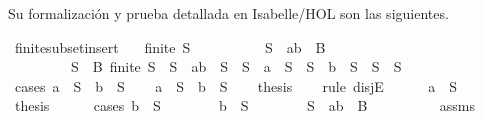 \begin{isabellebody}
\begin{isamarkuptext}
  Su formalización y prueba detallada en Isabelle/HOL son las siguientes.%
\end{isamarkuptext}\isamarkuptrue%
\isamarkupfalse%
\ finite{\isacharunderscore}subset{\isacharunderscore}insert{}{\isacharcolon}\isanewline
\ \ \ {\isachardoublequoteopen}finite\ S{\isachardoublequoteclose}\isanewline
\ \ \ \ \ \ \ \ \ \ {\isachardoublequoteopen}S\ {\isasymsubseteq}\ {\isacharbraceleft}a{\isacharcomma}b{\isacharbraceright}\ {\isasymunion}\ B{\isachardoublequoteclose}\isanewline
\ \ \ \ \ \ \ \ \ {\isachardoublequoteopen}{\isasymexists}S{\isacharprime}\ {\isasymsubseteq}\ B{\isachardot}\ finite\ S{\isacharprime}\ {\isasymand}\ {\isacharparenleft}S\ {\isacharequal}\ {\isacharbraceleft}a{\isacharcomma}b{\isacharbraceright}\ {\isasymunion}\ S{\isacharprime}\ {\isasymor}\ S\ {\isacharequal}\ {\isacharbraceleft}a{\isacharbraceright}\ {\isasymunion}\ S{\isacharprime}\ {\isasymor}\ S\ {\isacharequal}\ {\isacharbraceleft}b{\isacharbraceright}\ {\isasymunion}\ S{\isacharprime}\ {\isasymor}\ S\ {\isacharequal}\ S{\isacharprime}{\isacharparenright}{\isachardoublequoteclose}\isanewline
%
\isadelimproof
%
\endisadelimproof
%
\isatagproof
{}\isamarkupfalse%
\ {\isacharparenleft}cases\ {\isachardoublequoteopen}a\ {\isasymin}\ S\ {\isasymor}\ b\ {\isasymin}\ S{\isachardoublequoteclose}{\isacharparenright}\isanewline
\ \ \isamarkupfalse%
\ {\isachardoublequoteopen}a\ {\isasymin}\ S\ {\isasymor}\ b\ {\isasymin}\ S{\isachardoublequoteclose}\isanewline
\ \ \isamarkupfalse%
\ {\isacharquery}thesis\isanewline
\ \ \isamarkupfalse%
\ {\isacharparenleft}rule\ disjE{\isacharparenright}\isanewline
\ \ \ \ \isamarkupfalse%
\ {\isachardoublequoteopen}a\ {\isasymin}\ S{\isachardoublequoteclose}\isanewline
\ \ \ \ \isamarkupfalse%
\ {\isacharquery}thesis\isanewline
\ \ \ \ \isamarkupfalse%
\ {\isacharparenleft}cases\ {\isachardoublequoteopen}b\ {\isasymin}\ S{\isachardoublequoteclose}{\isacharparenright}\isanewline
\ \ \ \ \ \ \isamarkupfalse%
\ {\isachardoublequoteopen}b\ {\isasymin}\ S{\isachardoublequoteclose}\isanewline
\ \ \ \ \ \ \isamarkupfalse%
\ {}{\isacharcolon}{\isachardoublequoteopen}S\ {\isacharminus}\ {\isacharbraceleft}a{\isacharcomma}b{\isacharbraceright}\ {\isasymsubseteq}\ B{\isachardoublequoteclose}\isanewline
\ \ \ \ \ \ \ \ \isamarkupfalse%
\ assms{\isacharparenleft}{}{\isacharparenright}\ \isamarkupfalse%

\end{isabellebody}
